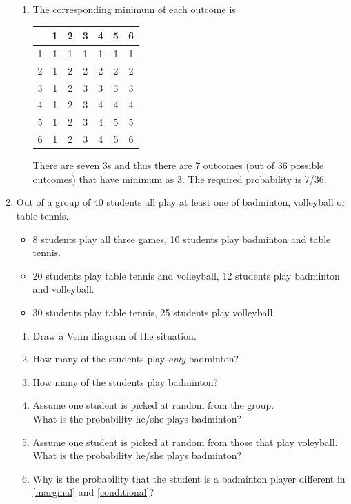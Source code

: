 \documentclass[10pt]{article}
\begin{document}
\begin{enumerate}
{\begin{enumerate}
\begin{center}
          \end{center}
          There are five 6s and thus there are 5 outcomes (out of 36 possible outcomes)
          that have sum as 6. The
          required probability is 5/36.
        \item The corresponding minimum of each outcome is
          \begin{center}
            \begin{tabular}{c|cccccc}
              & 1 & 2 & 3 & 4 & 5 & 6\\\hline
              1 & 1 & 1 & 1 & 1 & 1 & 1\\
              2 & 1 & 2 & 2 & 2 & 2 & 2\\ 
              3 & 1 & 2 & 3 & 3 & 3 & 3\\ 
              4 & 1 & 2 & 3 & 4 & 4 & 4\\ 
              5 & 1 & 2 & 3 & 4 & 5 & 5\\ 
              6 & 1 & 2 & 3 & 4 & 5 & 6
            \end{tabular}
          \end{center}
          There are seven 3s and thus there are 7 outcomes (out of 36 possible outcomes)
          that have minimum as 3. The
          required probability is 7/36.
      \end{enumerate}
    }
    
\item
  Out of a group of 40 students all play at least one of badminton, volleyball or table tennis.
  \begin{itemize}
    \item 8 students play all three games, 10 students play badminton and table tennis.
    \item 20 students play table tennis and volleyball, 12 students play badminton and volleyball.
    \item 30 students play table tennis, 25 students play volleyball.
  \end{itemize}
  \begin{enumerate}
    \item
      Draw a Venn diagram of the situation.
    \item
      How many of the students play \emph{only} badminton?
    \item
      How many of the students play badminton?
    \item \label{marginal}
      Assume one student is picked at random from the group.\\
      What is the probability he/she plays badminton?
    \item \label{conditional}
      Assume one student is picked at random from those that play voleyball.\\
      What is the probability he/she plays badminton?
    \item
      Why is the probability that the student is a badminton player different in \ref{marginal} and \ref{conditional}?
  \end{enumerate}


\end{enumerate}
\end{document}
